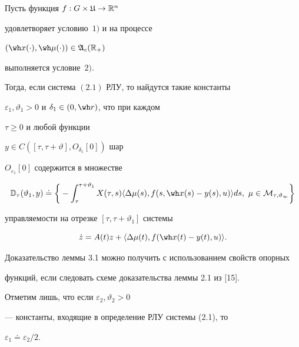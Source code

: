 \begin{lems}


Пусть функция $f:G\times\frak U\to\Bbb R^n$


удовлетворяет условию~$1)$ и на процессе


$(\wh x(\cdot),\wh\mu(\cdot))\in\frak A_c(\bR_+)$


выполняется условие~$2)$.


Тогда, если система $(2.1)$ РЛУ, то найдутся такие константы


$\varepsilon_1,\vartheta_1>0$ и $\delta_1\in(0,\wh r)$, что при каждом


$\tau\ge0$ и любой функции


$y\in C([\tau,\tau+\vartheta],O_{\delta_1}[0])$ шар


$O_{\varepsilon_1}[0]$ содержится в множестве


\begin{equation}


\Bbb D_\tau(\vartheta_1,y)


\doteq\bigg\{-\int_\tau^{\tau+\vartheta_1}X(\tau,s)


\langle\Delta\mu(s),f(s,\wh x(s)-y(s),u)\rangle ds,\ \mu


\in\cal M_{\tau,\vartheta_1}\bigg\}


\end{equation}


управляемости на отрезке $[\tau,\tau+\vartheta_1]$ системы


\begin{equation}


\Dot z=A(t)z+\langle \Delta\mu(t),f(\wh x(t)-y(t),u)\rangle.


\end{equation}


\end{lems}





Доказательство леммы 3.1 можно получить с использованием свойств опорных


функций, если следовать схеме доказательства леммы 2.1 из [15].


Отметим лишь, что если $\varepsilon_2,\vartheta _2>0$


--- константы, входящие в определение РЛУ системы (2.1), то


$\varepsilon_1\doteq\varepsilon_2/2$.





